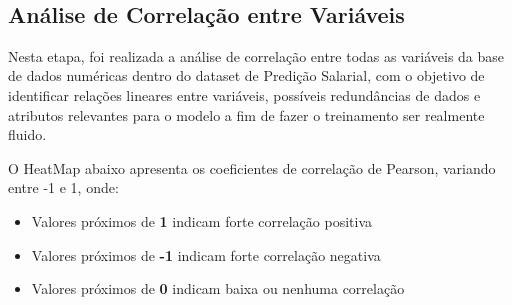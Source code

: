 \documentclass[11pt]{article}
\providecommand{\tightlist}{%
      \setlength{\itemsep}{0pt}\setlength{\parskip}{0pt}}
\begin{document}
    \begin{center}
    \end{center}
    { \hspace*{\fill} \\}
    
    \subsection{Análise de Correlação entre
Variáveis}\label{anuxe1lise-de-correlauxe7uxe3o-entre-variuxe1veis}

Nesta etapa, foi realizada a análise de correlação entre todas as
variáveis da base de dados numéricas dentro do dataset de Predição
Salarial, com o objetivo de identificar relações lineares entre
variáveis, possíveis redundâncias de dados e atributos relevantes para o
modelo a fim de fazer o treinamento ser realmente fluido.

O HeatMap abaixo apresenta os coeficientes de correlação de Pearson,
variando entre -1 e 1, onde:

\begin{itemize}
\tightlist
\item
  Valores próximos de \textbf{1} indicam forte correlação positiva\\
\item
  Valores próximos de \textbf{-1} indicam forte correlação negativa\\
\item
  Valores próximos de \textbf{0} indicam baixa ou nenhuma correlação
\end{itemize}
\end{document}
